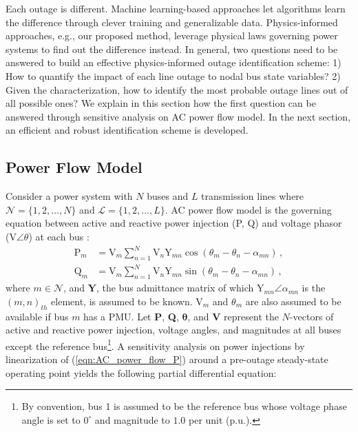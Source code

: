 Each outage is different. Machine learning-based approaches let algorithms learn the difference through clever training and generalizable data. Physics-informed approaches, e.g., our proposed method, leverage physical laws governing power systems to find out the difference instead. In general, two questions need to be answered to build an effective physics-informed outage identification scheme: 1) How to quantify the impact of each line outage to nodal bus state variables? 2) Given the characterization, how to identify the most probable outage lines out of all possible ones? We explain in this section how the first question can be answered through sensitive analysis on AC power flow model. In the next section, an efficient and robust identification scheme is developed. 

\subsection{Power Flow Model}
Consider a power system with $N$ buses and $L$ transmission lines where $\mathcal{N} = \{1, 2, \dots, N\}$ and $\mathcal{L} = \{1, 2, \dots, L\}$. AC power flow model is the governing equation between active and reactive power injection (P, Q) and voltage phasor (V$\angle\theta$) at each bus \cite{Glover2012}:
\begin{subequations}
\label{eqn:AC_power_flow_model}
\begin{align}
\text{P}_m &= \text{V}_m \sum_{n=1}^{N} \text{V}_n \text{Y}_{mn} \cos (\theta_m - \theta_n - \alpha_{mn}) \,, \label{eqn:AC_power_flow_P}\\
\text{Q}_m &= \text{V}_m \sum_{n=1}^{N} \text{V}_n \text{Y}_{mn} \sin (\theta_m - \theta_n - \alpha_{mn}) \,, \label{eqn:AC_power_flow_Q}
\end{align}
\end{subequations}
where $m \in \mathcal{N}$, and $\boldsymbol{Y}$, the bus admittance matrix of which Y$_{mn}\angle\alpha_{mn}$ is the $(m,n)_{th}$ element, is assumed to be known. $\text{V}_m$ and $\theta_m$ are also assumed to be available if bus $m$ has a PMU. Let \textbf{P}, \textbf{Q}, $\boldsymbol{\theta}$, and \textbf{V} represent the $N$-vectors of active and reactive power injection, voltage angles, and magnitudes at all buses except the reference bus\footnote{By convention, bus 1 is assumed to be the reference bus whose voltage phase angle is set to $0^\circ$ and magnitude to $1.0$ per unit (p.u.).}. 
A sensitivity analysis on power injections by linearization of (\ref{eqn:AC_power_flow_P}) around a pre-outage steady-state operating point yields the following partial differential equation: 
